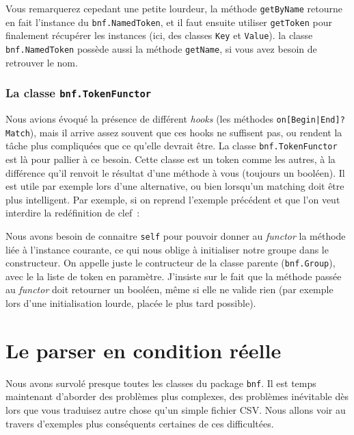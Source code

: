 \documentclass[a4paper]{article}
\newcommand{\fixed}[1]{\texttt{#1}}
\begin{document}
                Vous remarquerez cepedant une petite lourdeur, la méthode \fixed{getByName}
                retourne en fait l'instance du \fixed{bnf.NamedToken}, et il faut ensuite
                utiliser \fixed{getToken} pour finalement récupérer les instances (ici, des
                classes \fixed{Key} et \fixed{Value}). la classe \fixed{bnf.NamedToken}
                possède aussi la méthode \fixed{getName}, si vous avez besoin de retrouver
                le nom.

            \subsubsection{La classe \fixed{bnf.TokenFunctor}}
                Nous avions évoqué la présence de différent \emph{hooks} (les méthodes \fixed{on[Begin|End]?Match}),
                mais il arrive assez souvent que ces hooks ne suffisent pas, ou rendent la tâche plus
                compliquées que ce qu'elle devrait être. La classe \fixed{bnf.TokenFunctor} est
                là pour pallier à ce besoin. Cette classe est un token comme les autres, à la différence qu'il
                renvoit le résultat d'une méthode à vous (toujours un booléen). Il est utile
                par exemple lors d'une alternative, ou bien lorsqu'un matching doit être plus intelligent.
                Par exemple, si on reprend l'exemple précédent et que l'on veut interdire la
                redéfinition de clef~:

                Nous avons besoin de connaitre \fixed{self} pour pouvoir donner au \emph{functor} la
                méthode liée à l'instance courante, ce qui nous oblige à initialiser notre groupe dans
                le constructeur. On appelle juste le contructeur de la classe parente (\fixed{bnf.Group}),
                avec le la liste de token en paramètre. J'insiste sur le fait que la méthode passée
                au \emph{functor} doit retourner un booléen, même si elle ne valide rien (par
                exemple lors d'une initialisation lourde, placée le plus tard possible).


    \newpage
    \section{Le parser en condition réelle}
        Nous avons survolé presque toutes les classes du package \fixed{bnf}.
        Il est temps maintenant d'aborder des problèmes plus complexes, des
        problèmes inévitable dès lors que vous traduisez autre chose qu'un
        simple fichier CSV. Nous allons voir au travers d'exemples plus
        conséquents certaines de ces difficultées.
\end{document}
